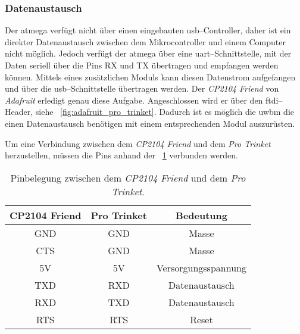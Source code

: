 \subsubsection{Datenaustausch}

Der \Gls{atmega} verfügt nicht über einen eingebauten \Gls{usb}--Controller, daher ist ein direkter Datenaustausch zwischen dem Mikrocontroller und einem Computer nicht möglich. Jedoch verfügt der \Gls{atmega} über eine \gls{uart}--Schnittstelle, mit der Daten seriell über die Pins RX und TX übertragen und empfangen werden können. Mittels eines zusätzlichen Moduls kann diesen Datenstrom aufgefangen und über die \Gls{usb}--Schnittstelle übertragen werden. Der \textit{CP2104 Friend} von \textit{Adafruit} erledigt genau diese Aufgabe. Angeschlossen wird er über den \gls{ftdi}--Header, siehe \figurename~\ref{fig:adafruit_pro_trinket}. Dadurch ist es möglich die \Gls{uwbm} die einen Datenaustausch benötigen mit einem entsprechenden Modul auszurüsten.

Um eine Verbindung zwischen dem \textit{CP2104 Friend} und dem \textit{Pro Trinket} herzustellen, müssen die Pins anhand der \tablename~\ref{tab:pin_assignment_between_cp2104_and_pro_trinket} verbunden werden.

\begin{table}
	\centering
	\begin{tabular}{||c|c|c||} 
		\hline
		CP2104 Friend & Pro Trinket & Bedeutung\\\hline
		\hline
		GND & GND & Masse\\\hline
		CTS & GND & Masse\\\hline
		\hline
		5V & 5V & Versorgungsspannung\\\hline
		\hline
		TXD & RXD & Datenaustausch\\\hline
		RXD & TXD & Datenaustausch\\\hline
		\hline
		RTS & RTS & Reset\\\hline
	\end{tabular}
	\caption{Pinbelegung zwischen dem \textit{CP2104 Friend} und dem \textit{Pro Trinket}.}
	\label{tab:pin_assignment_between_cp2104_and_pro_trinket}
\end{table}


\begin{comment}
- Kosten für den Aufbau
------------------------------------------------------------------------------------------
\end{comment}
